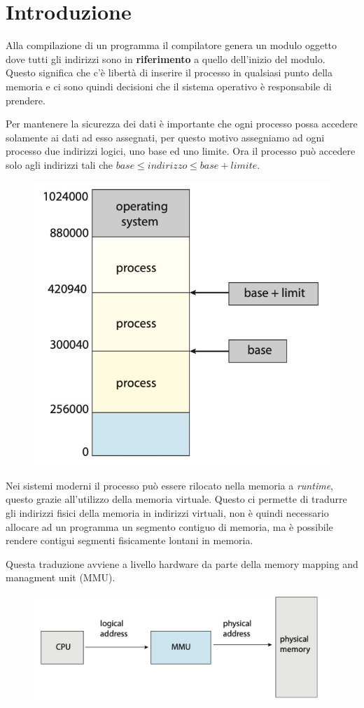 \section{Introduzione}
Alla compilazione di un programma il compilatore genera un modulo oggetto dove tutti gli indirizzi sono in \textbf{riferimento} a quello dell'inizio del modulo. Questo significa che c'è libertà di inserire il processo in qualsiasi punto della memoria e ci sono quindi decisioni che il sistema operativo è responsabile di prendere.

\spacer
Per mantenere la sicurezza dei dati è importante che ogni processo possa accedere solamente ai dati ad esso assegnati, per questo motivo assegniamo ad ogni processo due indirizzi logici, uno base ed uno limite. Ora il processo può accedere solo agli indirizzi tali che $base \le indirizzo \le base+limite$.

\begin{figure}[H]
    \centering
    \includegraphics[width=0.3\linewidth]{assets/base-limit-memory.jpg}
\end{figure}

Nei sistemi moderni il processo può essere rilocato nella memoria a \textit{runtime}, questo grazie all'utilizzo della memoria virtuale. Questo ci permette di tradurre gli indirizzi fisici della memoria in indirizzi virtuali, non è quindi necessario allocare ad un programma un segmento contiguo di memoria, ma è possibile rendere contigui segmenti fisicamente lontani in memoria.

Questa traduzione avviene a livello hardware da parte della memory mapping and managment unit (MMU).

\begin{figure}[H]
    \centering
    \includegraphics[width=0.45\linewidth]{assets/MMU.jpg}
\end{figure}

